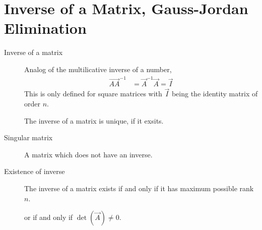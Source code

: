 \section{Inverse of a Matrix, Gauss-Jordan Elimination}
\begin{description}
    \item[Inverse of a matrix] Analog of the multilicative inverse of a number,
        \begin{align}
            \vec{AA}^{-1} & = \vec{A}^{-1}\vec{A} = \vec{I}
        \end{align}
        This is only defined for square matrices with $ \vec{I} $ being the identity
        matrix of order $ n $. \par
        The inverse of a matrix is unique, if it exsits.

    \item[Singular matrix] A matrix which does not have an inverse.

    \item[Existence of inverse] The inverse of a matrix exists if and only if it
        has maximum possible rank $ n $. \par
        or if and only if $ \det(\vec{A}) \neq 0 $.


\end{description}
